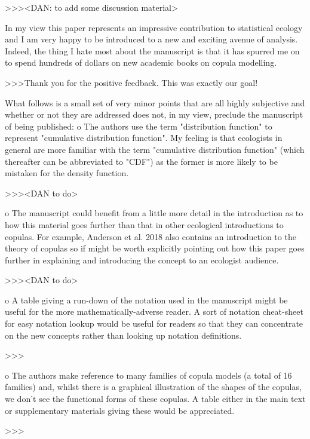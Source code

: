 >>><DAN: to add some discussion material>

In my view this paper represents an impressive contribution to statistical ecology and I am very happy to be introduced to a new and exciting avenue of analysis.  Indeed, the thing I hate most about the manuscript is that it has spurred me on to spend hundreds of dollars on new academic books on copula modelling.

>>>Thank you for the positive feedback. This was exactly our goal!

What follows is a small set of very minor points that are all highly subjective and whether or not they are addressed does not, in my view, preclude the manuscript of being published:
o    The authors use the term "distribution function" to represent "cumulative distribution function".  My feeling is that ecologists in general are more familiar with the term "cumulative distribution function" (which thereafter can be abbreviated to "CDF") as the former is more likely to be mistaken for the density function.

>>><DAN to do>

o    The manuscript could benefit from a little more detail in the introduction as to how this material goes further than that in other ecological introductions to copulas.  For example, Anderson et al. 2018 also contains an introduction to the theory of copulas so if might be worth explicitly pointing out how this paper goes further in explaining and introducing the concept to an ecologist audience.

>>><DAN to do>

o    A table giving a run-down of the notation used in the manuscript might be useful for the more mathematically-adverse reader.  A sort of notation cheat-sheet for easy notation lookup would be useful for readers so that they can concentrate on the new concepts rather than looking up notation definitions.

>>>

o    The authors make reference to many families of copula models (a total of 16 families) and, whilst there is a graphical illustration of the shapes of the copulas, we don't see the functional forms of these copulas.  A table either in the main text or supplementary materials giving these would be appreciated.
 
>>>
